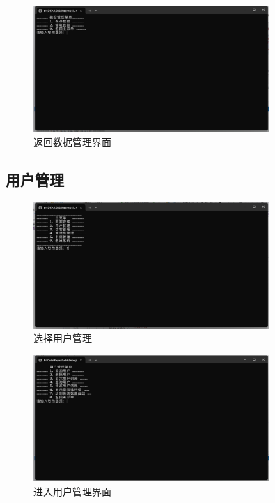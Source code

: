 \documentclass[12pt,twoside]{ctexart}
\begin{document}
\begin{figure}[H]
    \centering
    \includegraphics[width=0.8\textwidth]{ReadReturn.png}
    \caption{返回数据管理界面}
\end{figure}

\newpage
\subsection{用户管理}

\begin{figure}[H]
    \centering
    \includegraphics[width=0.8\textwidth]{SelectUser.png}
    \caption{选择用户管理}
\end{figure}

\begin{figure}[H]
    \centering
    \includegraphics[width=0.8\textwidth]{User.png}
    \caption{进入用户管理界面}
\end{figure}
\end{document}
